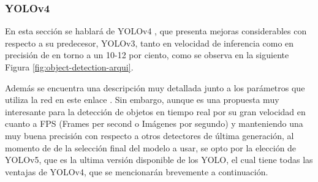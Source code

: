 \newpage
\subsubsection{YOLOv4}

En esta sección se hablará de YOLOv4 \cite{yolov4}, que presenta mejoras considerables con respecto a su predecesor, YOLOv3, tanto en velocidad de inferencia como en precisión de en torno a un 10-12 por ciento, como se observa en la siguiente Figura \ref{fig:object-detection-arqui}.

Además se encuentra una descripción muy detallada junto a los parámetros que utiliza la red en este enlace \cite{yolov4info}. Sin embargo, aunque es una propuesta muy interesante para la detección de objetos en tiempo real por su gran velocidad en cuanto a FPS (Frames per second o Imágenes por segundo) y manteniendo una muy buena precisión con respecto a otros detectores de última generación, al momento de de la selección final del modelo a usar, se opto por la elección de YOLOv5, que es la ultima versión disponible de los YOLO, el cual tiene todas las ventajas de YOLOv4, que se mencionarán brevemente a continuación. 

